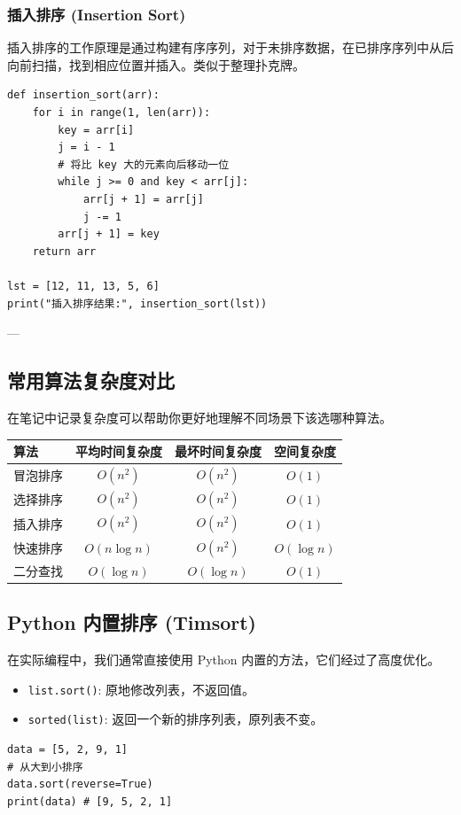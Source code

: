 \documentclass{article}
\begin{document}
\subsubsection{插入排序 (Insertion Sort)}
插入排序的工作原理是通过构建有序序列，对于未排序数据，在已排序序列中从后向前扫描，找到相应位置并插入。类似于整理扑克牌。

\begin{lstlisting}[caption=插入排序代码]
def insertion_sort(arr):
    for i in range(1, len(arr)):
        key = arr[i]
        j = i - 1
        # 将比 key 大的元素向后移动一位
        while j >= 0 and key < arr[j]:
            arr[j + 1] = arr[j]
            j -= 1
        arr[j + 1] = key
    return arr

lst = [12, 11, 13, 5, 6]
print("插入排序结果:", insertion_sort(lst))
\end{lstlisting}

---

\subsection{常用算法复杂度对比}

在笔记中记录复杂度可以帮助你更好地理解不同场景下该选哪种算法。

\begin{table}[h]
\centering
\begin{tabular}{|l|c|c|c|}
\hline
\textbf{算法} & \textbf{平均时间复杂度} & \textbf{最坏时间复杂度} & \textbf{空间复杂度} \\ \hline
冒泡排序 & $O(n^2)$ & $O(n^2)$ & $O(1)$ \\ \hline
选择排序 & $O(n^2)$ & $O(n^2)$ & $O(1)$ \\ \hline
插入排序 & $O(n^2)$ & $O(n^2)$ & $O(1)$ \\ \hline
快速排序 & $O(n \log n)$ & $O(n^2)$ & $O(\log n)$ \\ \hline
二分查找 & $O(\log n)$ & $O(\log n)$ & $O(1)$ \\ \hline
\end{tabular}
\end{table}

\subsection{Python 内置排序 (Timsort)}
在实际编程中，我们通常直接使用 Python 内置的方法，它们经过了高度优化。
\begin{itemize}
    \item \texttt{list.sort()}: 原地修改列表，不返回值。
    \item \texttt{sorted(list)}: 返回一个新的排序列表，原列表不变。
\end{itemize}

\begin{lstlisting}
data = [5, 2, 9, 1]
# 从大到小排序
data.sort(reverse=True) 
print(data) # [9, 5, 2, 1]
\end{lstlisting}
\end{document}
